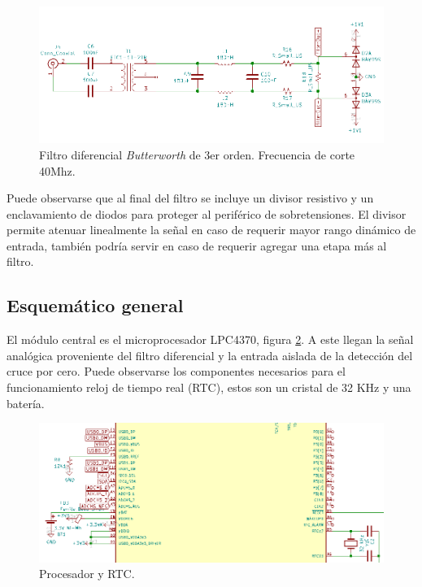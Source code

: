 \begin{figure}[ht]
	\centering
	\includegraphics[width=140mm]{./Figures/schFiltro.png}
	\caption{Filtro diferencial \textit{Butterworth} de 3er orden. Frecuencia de corte 40Mhz.}
	\label{fig:schFiltro}
\end{figure}


Puede observarse que al final del filtro se incluye un divisor resistivo y un enclavamiento de diodos para proteger al periférico de sobretensiones. El divisor permite atenuar linealmente la señal en caso de requerir mayor rango dinámico de entrada, también podría servir en caso de requerir agregar una etapa más al filtro.

\subsection{Esquemático general} 

El módulo central es el microprocesador LPC4370, figura \ref{fig:schCentral}. A este llegan la señal analógica proveniente del filtro diferencial y la entrada aislada de la detección del cruce por cero. Puede observarse los componentes necesarios para el funcionamiento reloj de tiempo real (RTC), estos son un cristal de 32 KHz y una batería.


\begin{figure}[ht]
	\centering
	\includegraphics[width=140mm]{./Figures/schCentral.png}
	\caption{Procesador y RTC.}
	\label{fig:schCentral}
\end{figure}


